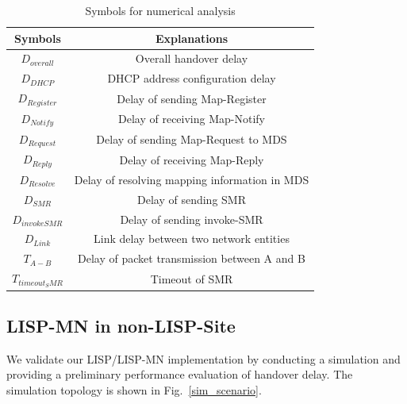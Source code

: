 \begin{table}[!tb]
	\centering
	\caption{Symbols for numerical analysis}
	\label{Symbols_numerical_analysis}{
		\begin{tabular}{@{}|c|c|@{}}
			\hline\hline
			Symbols & Explanations   \\ \hline
			$D_{overall}$ & Overall handover delay	\\  \hline    
			$D_{DHCP}$ &  DHCP address configuration delay \\  \hline    
			$D_{Register}$ &  Delay of sending Map-Register      	\\  \hline
			$D_{Notify}$ &  Delay of receiving Map-Notify      	\\  \hline           
			$D_{Request}$ &  Delay of sending Map-Request to MDS      	\\  \hline   
			$D_{Reply}$ &  Delay of receiving Map-Reply      	\\  \hline      
			$D_{Resolve}$ &  Delay of resolving mapping information in MDS      	\\  \hline               
			$D_{SMR}$ &  Delay of sending SMR       	\\  \hline 
			$D_{invokeSMR}$ &  Delay of sending invoke-SMR \\  \hline 
			$D_{Link}$ &  Link delay between two network entities \\  \hline 
			$T_{A-B}$ &  Delay of packet transmission between A and B     	\\  \hline
			$T_{timeout_SMR}$ &  Timeout of SMR     	\\  \hline  \hline               
		\end{tabular}
	}
\end{table}





\subsection{LISP-MN in non-LISP-Site}
\label{sec:ns3_analysis_lispmn}
We validate our LISP/LISP-MN implementation by conducting a simulation and providing a preliminary performance evaluation of handover delay. The simulation topology is shown in Fig.~\ref{sim_scenario}.

